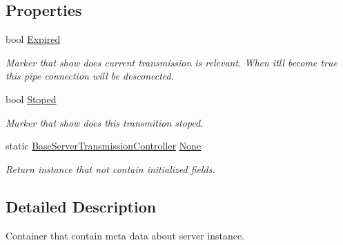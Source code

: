 \subsection*{Properties}
\begin{DoxyCompactItemize}
\item 
bool \mbox{\hyperlink{class_pipes_provider_1_1_server_1_1_transmission_controllers_1_1_base_server_transmission_controller_ad57a0420e71e3897e7e1b67c16b995f6}{Expired}}
\begin{DoxyCompactList}\small\item\em Marker that show does current transmission is relevant. When it\textquotesingle{}ll become true this pipe connection will be desconected. \end{DoxyCompactList}\item 
bool \mbox{\hyperlink{class_pipes_provider_1_1_server_1_1_transmission_controllers_1_1_base_server_transmission_controller_ae159fdf4582f9419d9e3616d2aa2d37e}{Stoped}}
\begin{DoxyCompactList}\small\item\em Marker that show does this transmition stoped. \end{DoxyCompactList}\item 
static \mbox{\hyperlink{class_pipes_provider_1_1_server_1_1_transmission_controllers_1_1_base_server_transmission_controller}{Base\+Server\+Transmission\+Controller}} \mbox{\hyperlink{class_pipes_provider_1_1_server_1_1_transmission_controllers_1_1_base_server_transmission_controller_af60aaebfbfe6988e008cedb18f32c759}{None}}
\begin{DoxyCompactList}\small\item\em Return instance that not contain initialized fields. \end{DoxyCompactList}\end{DoxyCompactItemize}


\subsection{Detailed Description}
Container that contain meta data about server instance. 



